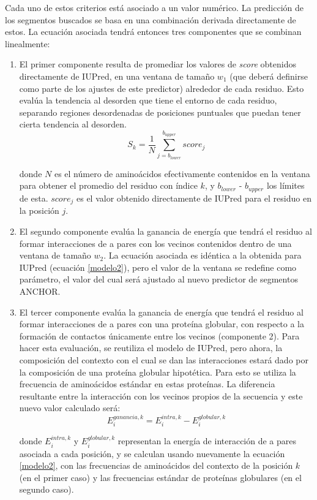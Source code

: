 Cada uno de estos criterios está asociado a un valor numérico. La predicción de los segmentos buscados se basa en una combinación derivada directamente de estos.
La ecuación asociada tendrá entonces tres componentes que se combinan linealmente:
\begin{enumerate}
 \item El primer componente resulta de promediar los valores de \textit{score} obtenidos directamente de IUPred, en una ventana de tamaño $w_1$ (que deberá definirse como parte de los ajustes de este predictor) alrededor de cada residuo. 
Esto evalúa la tendencia al desorden que tiene el entorno de cada residuo, separando regiones desordenadas de posiciones puntuales que puedan tener cierta tendencia al desorden.
\begin{equation}\label{score1}
 S_k = \frac{1}{N} \sum_{j=b_{lower}}^{b_{upper}} score_j
\end{equation}

donde $N$ es el número de aminoácidos efectivamente contenidos en la ventana para obtener el promedio del residuo con índice $k$, y $b_{lower}$ - $b_{upper}$ los límites de esta.
$score_j$ es el valor obtenido directamente de IUPred para el residuo en la posición $j$.

\item El segundo componente evalúa la ganancia de energía que tendrá el residuo al formar interacciones de a pares con los vecinos contenidos dentro de una ventana de tamaño $w_2$. 
La ecuación asociada es idéntica a la obtenida para IUPred (ecuación \ref{modelo2}), pero el valor de la ventana se redefine como parámetro, el valor del cual será ajustado 
al nuevo predictor de segmentos ANCHOR.

\item El tercer componente evalúa la ganancia de energía que tendrá el residuo al formar interacciones de a pares con una proteína globular, 
con respecto a la formación de contactos únicamente entre los vecinos (componente 2). Para hacer esta evaluación, se reutiliza el modelo de IUPred, pero ahora, 
la composición del contexto con el cual se dan las interacciones estará dado por la composición de una proteína globular hipotética. 
Para esto se utiliza la frecuencia de aminoácidos estándar en estas proteínas.
La diferencia resultante entre la interacción con los vecinos propios de la secuencia y este nuevo valor calculado será:
\begin{equation}\label{score3}
E_i^{ganancia,k} = E_i^{intra,k} - E_i^{globular,k}
\end{equation}

\noindent donde $E_i^{intra,k}$ y $E_i^{globular,k}$ representan la energía de interacción de a pares asociada a cada posición, y se calculan usando nuevamente la ecuación \ref{modelo2}, 
con las frecuencias de aminoácidos del contexto de la posición $k$ (en el primer caso) y las frecuencias estándar de proteínas globulares (en el segundo caso).
\end{enumerate}

